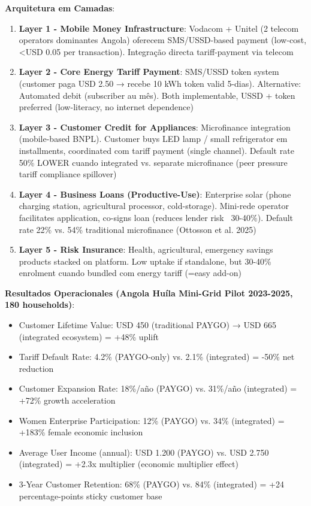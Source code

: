 \documentclass[12pt, a4paper]{article}
\begin{document}
\textbf{Arquitetura em Camadas}:
\begin{enumerate}
\item \textbf{Layer 1 - Mobile Money Infrastructure}: Vodacom + Unitel (2 telecom operators dominantes Angola) oferecem SMS/USSD-based payment (low-cost, <USD 0.05 per transaction). Integração directa tariff-payment via telecom
\item \textbf{Layer 2 - Core Energy Tariff Payment}: SMS/USSD token system (customer paga USD 2.50 → recebe 10 kWh token valid 5-dias). Alternative: Automated debit (subscriber au mês). Both implementable, USSD + token preferred (low-literacy, no internet dependence)
\item \textbf{Layer 3 - Customer Credit for Appliances}: Microfinance integration (mobile-based BNPL). Customer buys LED lamp / small refrigerator em installments, coordinated com tariff payment (single channel). Default rate 50\% LOWER cuando integrated vs. separate microfinance (peer pressure tariff compliance spillover)
\item \textbf{Layer 4 - Business Loans (Productive-Use)}: Enterprise solar (phone charging station, agricultural processor, cold-storage). Mini-rede operator facilitates application, co-signs loan (reduces lender risk ~30-40\%). Default rate 22\% vs. 54\% traditional microfinance (Ottosson et al. 2025)
\item \textbf{Layer 5 - Risk Insurance}: Health, agricultural, emergency savings products stacked on platform. Low uptake if standalone, but 30-40\% enrolment cuando bundled com energy tariff (=easy add-on)
\end{enumerate}

\textbf{Resultados Operacionales (Angola Huíla Mini-Grid Pilot 2023-2025, 180 households)}:
\begin{itemize}
\item Customer Lifetime Value: USD 450 (traditional PAYGO) → USD 665 (integrated ecosystem) = +48\% uplift
\item Tariff Default Rate: 4.2\% (PAYGO-only) vs. 2.1\% (integrated) = -50\% net reduction
\item Customer Expansion Rate: 18\%/año (PAYGO) vs. 31\%/año (integrated) = +72\% growth acceleration
\item Women Enterprise Participation: 12\% (PAYGO) vs. 34\% (integrated) = +183\% female economic inclusion
\item Average User Income (annual): USD 1.200 (PAYGO) vs. USD 2.750 (integrated) = +2.3x multiplier (economic multiplier effect)
\item 3-Year Customer Retention: 68\% (PAYGO) vs. 84\% (integrated) = +24 percentage-points sticky customer base
\end{itemize}
\end{document}

